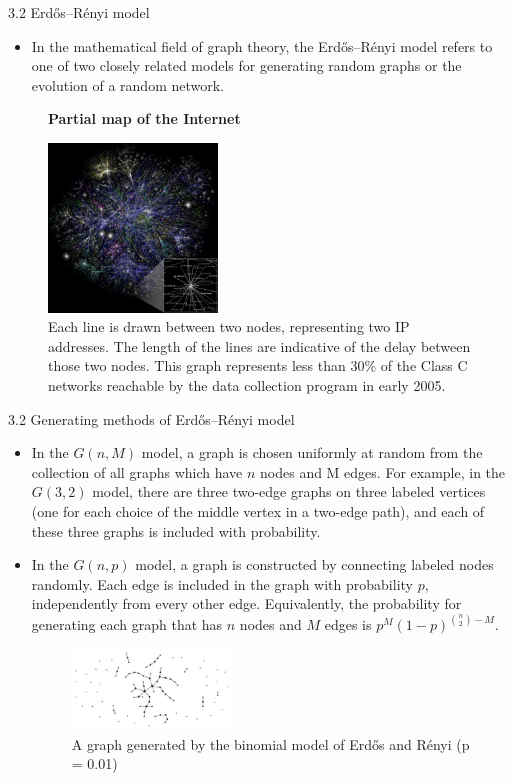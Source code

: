 \documentclass[
  notheorems,
  aspectratio=54,
]{beamer}
\begin{document}
\begin{frame}{3.2 Erdős–Rényi model}
  \begin{itemize}
      \item In the mathematical field of graph theory, the Erdős–Rényi model\cite{wiki:er_model} refers to one of two closely related models for generating random graphs or the evolution of a random network.
  \end{itemize}
  \begin{figure}
    \centering
    \textbf{Partial map of the Internet}\par\medskip
    \includegraphics[width=0.4\textwidth]{internet_map.jpg}
      \caption{Each line is drawn between two nodes, representing two IP addresses. The length of the lines are indicative of the delay between those two nodes. This graph represents less than 30\% of the Class C networks reachable by the data collection program in early 2005.}
  \end{figure}
\end{frame}

\begin{frame}{3.2 Generating methods of Erdős–Rényi model}
  \begin{itemize}
    \item In the $G(n, M)$ model, a graph is chosen uniformly at random from the collection of all graphs which have $n$ nodes and M edges. For example, in the $G(3,2)$ model, there are three two-edge graphs on three labeled vertices (one for each choice of the middle vertex in a two-edge path), and each of these three graphs is included with probability.
    \item In the $G(n, p)$ model, a graph is constructed by connecting labeled nodes randomly. Each edge is included in the graph with probability $p$, independently from every other edge. Equivalently, the probability for generating each graph that has $n$ nodes and $M$ edges is ${\displaystyle p^{M}(1-p)^{{n \choose 2}-M}}$.
  \begin{figure}
    \centering
    \includegraphics[width=0.4\textwidth]{er_example.jpg}
    \caption{A graph generated by the binomial model of Erdős and Rényi (p = 0.01)}
  \end{figure}
  \end{itemize}
\end{frame}
\end{document}
